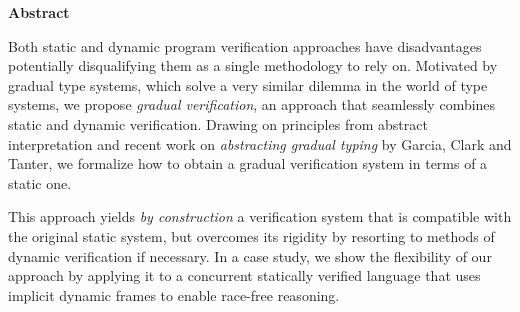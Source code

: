 \begin{center}
\begin{minipage}{0.7\textwidth}
\vspace*{15\baselineskip}
\begin{center}
\textbf{Abstract}
\end{center}
Both static and dynamic program verification approaches have disadvantages potentially disqualifying them as a single methodology to rely on.
Motivated by gradual type systems, which solve a very similar dilemma in the world of type systems, we propose \textit{gradual verification}, an approach that seamlessly combines static and dynamic verification.
Drawing on principles from abstract interpretation and recent work on \textit{abstracting gradual typing} by Garcia, Clark and Tanter, we formalize how to obtain a gradual verification system in terms of a static one.

This approach yields \textit{by construction} a verification system that is compatible with the original static system, but overcomes its rigidity by resorting to methods of dynamic verification if necessary.
In a case study, we show the flexibility of our approach by applying it to a concurrent statically verified language that uses implicit dynamic frames to enable race-free reasoning.
\end{minipage}
\end{center}
